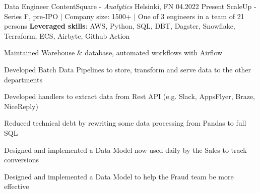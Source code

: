 

\begin{cventries}

\cventry
{Data Engineer} %
{ContentSquare - \emph{Analytics}} %
{Helsinki, FN} %
{04.2022} %
{Present} %
{ScaleUp - Series F, pre-IPO | Company size: 1500+ | One of 3 engineers in a team of 21 persons} %
{\textbf{Leveraged skills}: AWS, Python, SQL, DBT, Dagster, Snowflake, Terraform, ECS, Airbyte, Github Action  } %
{
  \begin{cvitems} %
    \item {Maintained Warehouse \& database,  automated workflows with Airflow}
    \item {Developed Batch Data Pipelines to store, transform and serve data to the other departments}
    \item {Developed handlers to extract data from Rest API (e.g. Slack, AppsFlyer, Braze, NiceReply)}
    \item {Reduced technical debt by rewriting some data processing from Pandas to full SQL}
    \item {Designed and implemented a Data Model now used daily by the Sales to track conversions}
    \item {Designed and implemented a Data Model to help the Fraud team be more effective}
  \end{cvitems}
}


\end{cventries}
